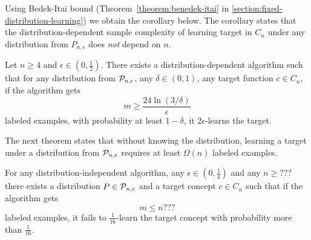 Using Bedek-Itai bound (Theorem~\ref{theorem:benedek-itai} in
\autoref{section:fixed-distribution-learning}) we obtain the corollary below.
The corollary states that the distribution-dependent sample complexity
of learning target in $C_n$ under any distribution from $P_{n,\epsilon}$
does \emph{not} depend on $n$.

\begin{corollary}
Let $n \ge 4$ and $\epsilon \in (0,\frac{1}{2})$.  There exists a
distribution-dependent algorithm such that for any distribution from $\P_{n,\epsilon}$,
any $\delta \in (0,1)$, any target function $c \in C_n$, if the algorithm gets
$$
m \ge \frac{24\ln(3/\delta)}{\epsilon}
$$
labeled examples, with
probability at least $1 - \delta$, it $2\epsilon$-learns the target.
\end{corollary}

The next theorem states that without knowing the distribution,
learning a target under a distribution from $\P_{n,\epsilon}$
requires at least $\Omega(n)$ labeled examples.

\begin{theorem}
For any distribution-independent algorithm, any $\epsilon \in (0,\frac{1}{4})$ and any
$n \ge ???$ there exists a distribution $P \in \P_{n,\epsilon}$ and a target
concept $c \in C_n$ such that if the algorithm gets
$$
m \le n ???
$$
labeled examples, it fails to $\frac{1}{16}$-learn the target concept with probability
more than $\frac{1}{16}$.
\end{theorem}

